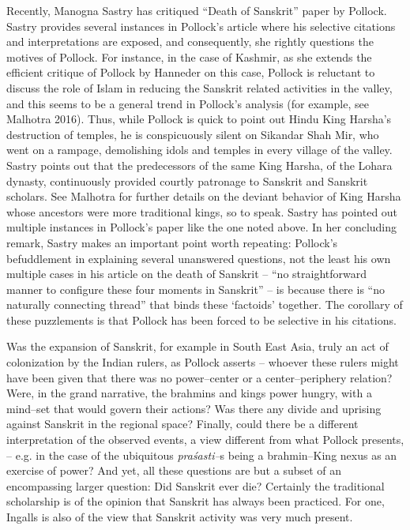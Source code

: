 Recently, Manogna Sastry has critiqued “Death of Sanskrit” paper by Pollock. Sastry provides several instances in Pollock’s article where his selective citations and interpretations are exposed, and consequently, she rightly questions the motives of Pollock. For instance, in the case of Kashmir, as she extends the efficient critique of Pollock by Hanneder on this case, Pollock is reluctant to discuss the role of Islam in reducing the Sanskrit related activities in the valley, and this seems to be a general trend in Pollock’s analysis (for example, see Malhotra 2016). Thus, while Pollock is quick to point out Hindu King Harsha’s destruction of temples, he is conspicuously silent on Sikandar Shah Mir, who went on a rampage, demolishing idols and temples in every village of the valley. Sastry points out that the predecessors of the same King Harsha, of the Lohara dynasty, continuously provided courtly patronage to Sanskrit and Sanskrit scholars. See Malhotra for further details on the deviant behavior of King Harsha whose ancestors were more traditional kings, so to speak. Sastry has pointed out multiple instances in Pollock’s paper like the one noted above. In her concluding remark, Sastry makes an important point worth repeating: Pollock’s befuddlement in explaining several unanswered questions, not the least his own multiple cases in his article on the death of Sanskrit – “no straightforward manner to configure these four moments in Sanskrit” – is because there is “no naturally connecting thread” that binds these ‘factoids’ together. The corollary of these puzzlements is that Pollock has been forced to be selective in his citations.

Was the expansion of Sanskrit, for example in South East Asia, truly an act of colonization by the Indian rulers, as Pollock asserts – whoever these rulers might have been given that there was no power–center or a center–periphery relation? Were, in the grand narrative, the brahmins and kings power hungry, with a mind–set that would govern their actions? Was there any divide and uprising against Sanskrit in the regional space? Finally, could there be a different interpretation of the observed events, a view different from what Pollock presents, – e.g. in the case of the ubiquitous \textit{praśasti–}s being a brahmin–King nexus as an exercise of power? And yet, all these questions are but a subset of an encompassing larger question: Did Sanskrit ever die? Certainly the traditional scholarship is of the opinion that Sanskrit has always been practiced. For one, Ingalls is also of the view that Sanskrit activity was very much present.

